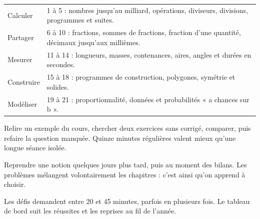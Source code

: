 \clearpage\thispagestyle{otFront}\label{parcours}\fontsize{11}{15}\selectfont

\begin{tabularx}{\linewidth}{@{}lY@{}}\toprule
Calculer & 1 à 5 : nombres jusqu’au milliard, opérations, diviseurs, divisions, programmes et suites.\\[3mm]
Partager & 6 à 10 : fractions, sommes de fractions, fraction d’une quantité, décimaux jusqu’aux millièmes.\\[3mm]
Mesurer & 11 à 14 : longueurs, masses, contenances, aires, angles et durées en secondes.\\[3mm]
Construire & 15 à 18 : programmes de construction, polygones, symétrie et solides.\\[3mm]
Modéliser & 19 à 21 : proportionnalité, données et probabilités « a chances sur b ».\\\bottomrule
\end{tabularx}
\begin{savoirfaire}Relire un exemple du cours,
chercher deux exercices sans corrigé, comparer, puis refaire la question
manquée. Quinze minutes régulières valent mieux qu’une longue séance
isolée.\end{savoirfaire}
\begin{savoirfaire}Reprendre une notion quelques jours
plus tard, puis au moment des bilans. Les problèmes mélangent
volontairement les chapitres : c’est ainsi qu’on apprend à choisir.\end{savoirfaire}
Les défis demandent entre 20 et 45 minutes, parfois en plusieurs fois.
Le tableau de bord suit les réussites et les reprises au fil de l’année.

\clearpage
